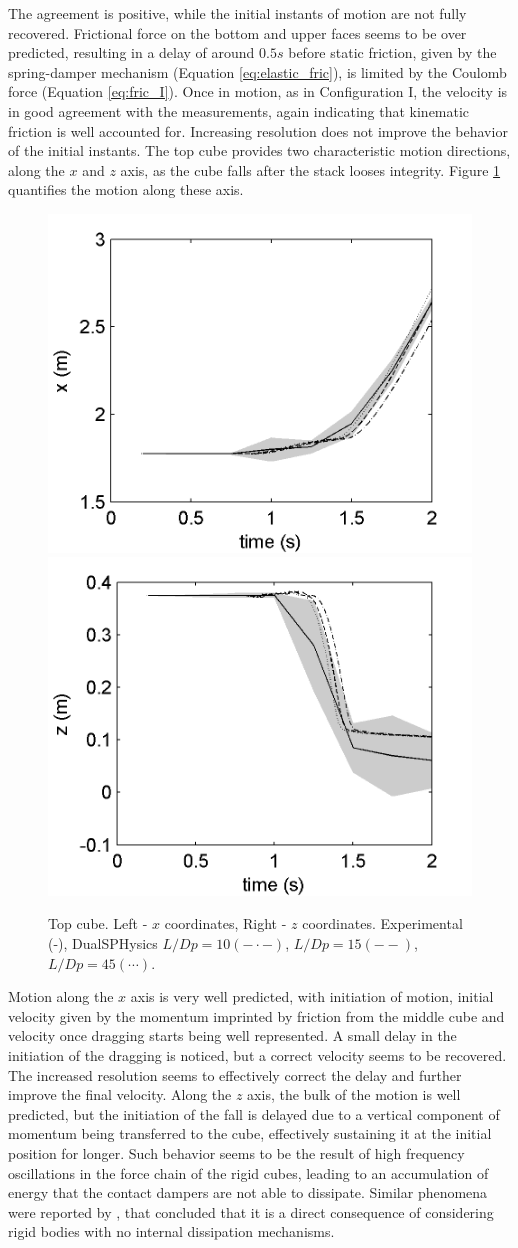 The agreement is positive, while the initial instants of motion are not fully recovered. Frictional force on the bottom and upper faces seems to be over predicted, resulting in a delay of around $0.5s$ before static friction, given by the spring-damper mechanism (Equation \eqref{eq:elastic_fric}), is limited by the Coulomb force (Equation \eqref{eq:fric_I}). Once in motion, as in Configuration I, the velocity is in good agreement with the measurements, again indicating that kinematic friction is well accounted for. Increasing resolution does not improve the behavior of the initial instants. The top cube provides two characteristic motion directions, along the $x$ and $z$ axis, as the cube falls after the stack looses integrity. Figure \ref{fig:cube3} quantifies the motion along these axis.
%
\begin{figure}[ht!]
	\centering 
	\includegraphics[width=0.45\linewidth]{Figures/5.Chapter/Fig_6a}
	\includegraphics[width=0.45\linewidth]{Figures/5.Chapter/Fig_6b}
	\caption{Top cube. Left - $x$ coordinates, Right - $z$ coordinates. Experimental (-), DualSPHysics $L/Dp=10 (- \cdot -)$, $L/Dp=15 (- -)$, $L/Dp=45 (\cdots)$.}
	\label{fig:cube3} 
\end{figure}
%

Motion along the $x$ axis is very well predicted, with initiation of motion, initial velocity given by the momentum imprinted by friction from the middle cube and velocity once dragging starts being well represented. A small delay in the initiation of the dragging is noticed, but a correct velocity seems to be recovered. The increased resolution seems to effectively correct the delay and further improve the final velocity. Along the $z$ axis, the bulk of the motion is well predicted, but the initiation of the fall is delayed due to a vertical component of momentum being transferred to the cube, effectively sustaining it at the initial position for longer. Such behavior seems to be the result of high frequency oscillations in the force chain of the rigid cubes, leading to an accumulation of energy that the contact dampers are not able to dissipate. Similar phenomena were reported by \cite{Cummins-2011}, that concluded that it is a direct consequence of considering rigid bodies with no internal dissipation mechanisms.


